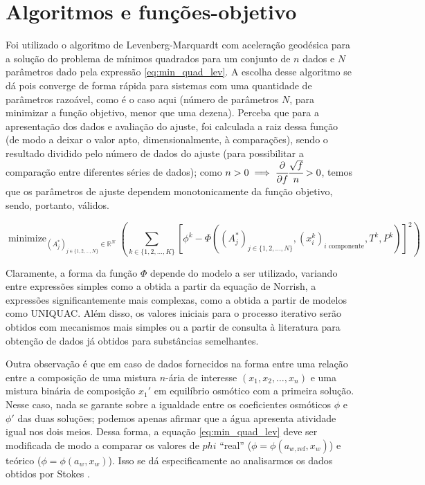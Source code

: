 \documentclass[
	12pt,				%
	openright,
	twoside,
	a4paper,			%
	english,			%
	french,				%
	spanish,			%
	brazil				%
	]{abntex2}
\DeclareMathOperator*{\minimize}{minimize}
\begin{document}
\section{Algoritmos e funções-objetivo}

Foi utilizado o algoritmo de Levenberg-Marquardt com aceleração geodésica para a
solução do problema de mínimos quadrados para um conjunto de $n$ dados e $N$
parâmetros dado pela expressão \ref{eq:min_quad_lev}.
A escolha desse algoritmo se dá pois converge de forma rápida para sistemas com
uma quantidade de parâmetros razoável, como é o caso aqui (número de parâmetros
$N$, para minimizar a função objetivo, menor que uma dezena).
Perceba que para a apresentação dos dados e avaliação do ajuste, foi calculada a
raiz dessa função (de modo a deixar o valor apto, dimensionalmente, à comparações),
sendo o resultado dividido pelo número de dados do ajuste (para possibilitar a
comparação entre diferentes séries de dados); como
$n>0 \implies \cfrac{\partial}{\partial f}\cfrac{\sqrt{f}}{n} >0$, temos que os
parâmetros de ajuste dependem monotonicamente da função objetivo, sendo, portanto,
válidos.

\begin{equation}
	\label{eq:min_quad_lev}
	\minimize_{(A_j^*)_{j \in \{1,2,\ldots,N\}} \in \mathbb{R}^N}%
	\left(\sum_{k \in \{1,2,\ldots,K\}}\left[\phi^k - \Phi((A^*_j)_{j%
	\in \{1, 2, \ldots, N\}}, (x^k_i)_\text{$i$ componente},%
	T^k, P^k)\right]^2\right)
\end{equation}

Claramente, a forma da função $\Phi$ depende do modelo a ser utilizado, variando
entre expressões simples como a obtida a partir da equação de Norrish, a
expressões significantemente mais complexas, como a obtida a partir de modelos
como UNIQUAC. Além disso, os valores iniciais para o processo iterativo serão
obtidos com mecanismos mais simples ou a partir de consulta à literatura para
obtenção de dados já obtidos para substâncias semelhantes.

Outra observação é que em caso de dados fornecidos na forma entre uma relação
entre a composição de uma mistura $n$-ária de interesse $(x_1,x_2,\ldots,x_n)$
e uma mistura binária de composição $x_1'$ em equilíbrio osmótico com a
primeira solução. Nesse caso, nada se garante sobre a igualdade entre os
coeficientes osmóticos $\phi$ e $\phi'$ das duas soluções; podemos apenas
afirmar que a água apresenta atividade igual nos dois meios. Dessa forma,
a equação \ref{eq:min_quad_lev} deve ser modificada de modo a comparar os
valores de $phi$ ``real'' ($\phi=\phi(a_{w,\text{ref}},x_w)$) e teórico
($\phi=\phi(a_w,x_w)$). Isso se dá especificamente ao analisarmos os dados
obtidos por Stokes \cite{stokes1966}.
\end{document}
